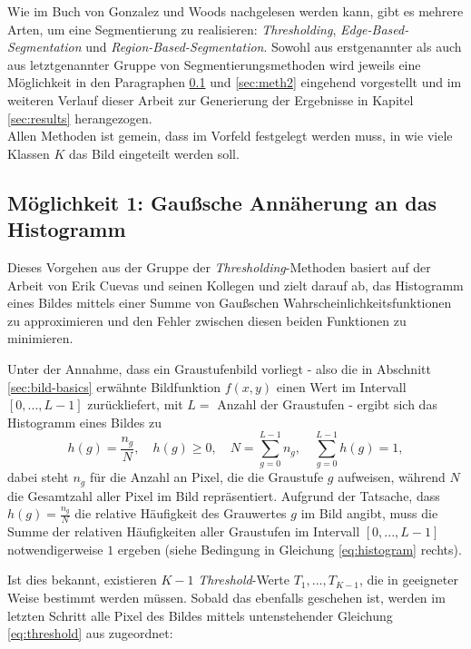 		Wie im Buch \cite[Kapitel 10]{gonzalez-woods} von Gonzalez und Woods nachgelesen werden kann, gibt es mehrere Arten, um eine Segmentierung zu realisieren: \textit{Thresholding}, \textit{Edge-Based-Segmentation} und \textit{Region-Based-Segmentation}. Sowohl aus erstgenannter als auch aus letztgenannter Gruppe von Segmentierungsmethoden wird jeweils eine Möglichkeit in den Paragraphen \ref{sec:meth1} und \ref{sec:meth2} eingehend vorgestellt und im weiteren Verlauf dieser Arbeit zur Generierung der Ergebnisse in Kapitel \ref{sec:results} herangezogen. \\
		Allen Methoden ist gemein, dass im Vorfeld festgelegt werden muss, in wie viele Klassen $K$ das Bild eingeteilt werden soll. 
		
	\subsection{Möglichkeit 1: Gaußsche Annäherung an das Histogramm}
	\label{sec:meth1}
		
		Dieses Vorgehen aus der Gruppe der \textit{Thresholding}-Methoden basiert auf der Arbeit von Erik Cuevas und seinen Kollegen \cite{cuevas-meth1} und zielt darauf ab, das Histogramm eines Bildes mittels einer Summe von Gaußschen Wahrscheinlichkeitsfunktionen zu approximieren und den Fehler zwischen diesen beiden Funktionen zu minimieren.
		
		Unter der Annahme, dass ein Graustufenbild vorliegt - also die in Abschnitt \ref{sec:bild-basics} erwähnte Bildfunktion $f(x,y)$ einen Wert im Intervall $[0, ..., L-1]$ zurückliefert, mit $L = $ Anzahl der Graustufen - ergibt sich das Histogramm eines Bildes zu
		\begin{equation}
			h(g) = \frac{n_{g}}{N}, \quad h(g) \geq 0, \quad N = \sum_{g=0}^{L-1} n_{g}, \quad \sum_{g=0}^{L-1} h(g) = 1,
			\label{eq:histogram}
		\end{equation}
		dabei steht $n_{g}$ für die Anzahl an Pixel, die die Graustufe $g$ aufweisen, während $N$ die Gesamtzahl aller Pixel im Bild repräsentiert. Aufgrund der Tatsache, dass $h(g)  =\frac{n_{g}}{N}$ die relative Häufigkeit des Grauwertes $g$ im Bild angibt, muss die Summe der relativen Häufigkeiten aller Graustufen im Intervall $[0, ... , L-1]$ notwendigerweise $1$ ergeben (siehe Bedingung in Gleichung \ref{eq:histogram} rechts).
		
		Ist dies bekannt, existieren $K-1$ \textit{Threshold}-Werte $T_{1}, ... , T_{K-1}$, die in geeigneter Weise bestimmt werden müssen. Sobald das ebenfalls geschehen ist, werden im letzten Schritt alle Pixel des Bildes mittels untenstehender Gleichung \ref{eq:threshold} aus \cite[S. 739]{gonzalez-woods} zugeordnet:
		
